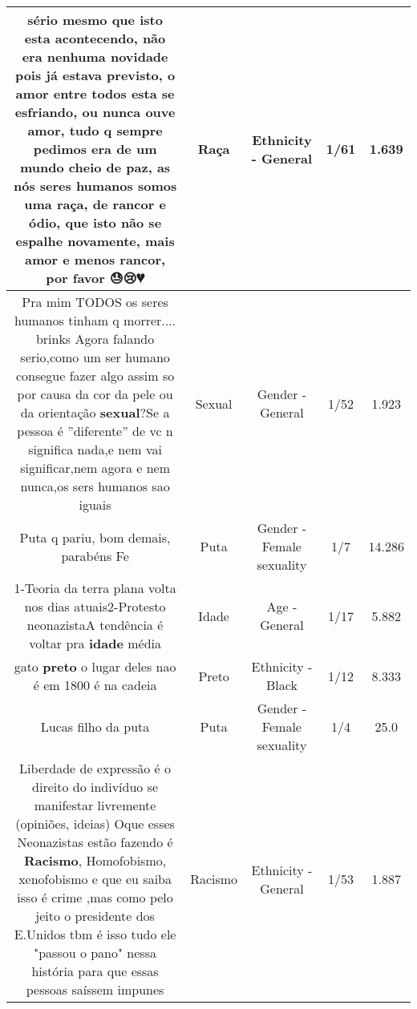 \documentclass[11pt]{article}
\newlength\mylength
\begin{document}
\begin{center}
\begin{longtable}{|C{.65\mylength}|C{.30\mylength}|C{.12\mylength}|C{.12\mylength}|C{.12\mylength}|}
  \small sério mesmo que isto esta acontecendo,  não era nenhuma novidade pois já estava previsto, o amor entre todos esta se esfriando,  ou nunca ouve amor, tudo q sempre pedimos era de um mundo cheio de paz, as nós seres humanos somos uma \textbf{raça},  de rancor e ódio,  que isto não se espalhe novamente,  mais amor e menos rancor, por favor 😓😢💔\normalsize   & Raça & Ethnicity - General & 1/61 & 1.639 \\  \hline
  \small Pra mim TODOS os seres humanos tinham q morrer.... brinks Agora falando serio,como um ser humano consegue fazer algo assim so por causa da cor da pele ou da orientação \textbf{sexual}?Se a pessoa é ''diferente'' de vc n significa nada,e nem vai significar,nem agora e  nem nunca,os sers humanos sao iguais\normalsize   & Sexual & Gender - General & 1/52 & 1.923 \\  \hline
  \small Puta q pariu, bom demais, parabéns Fe\normalsize   & Puta & Gender - Female sexuality & 1/7 & 14.286 \\  \hline
  \small 1-Teoria da terra plana volta nos dias atuais2-Protesto neonazistaA tendência é voltar pra \textbf{idade} média\normalsize   & Idade & Age - General & 1/17 & 5.882 \\  \hline
  \small gato \textbf{preto} o lugar deles nao é em 1800 é na cadeia\normalsize   & Preto & Ethnicity - Black & 1/12 & 8.333 \\  \hline
  \small Lucas filho da puta\normalsize   & Puta & Gender - Female sexuality & 1/4 & 25.0 \\  \hline
  \small Liberdade de expressão é o direito do indivíduo se manifestar livremente (opiniões, ideias) Oque esses Neonazistas estão fazendo é \textbf{Racismo}, Homofobismo,  xenofobismo e que eu saiba isso é crime ,mas como pelo jeito o presidente dos E.Unidos tbm é isso tudo ele "passou o pano" nessa história para que essas pessoas saíssem impunes\normalsize   & Racismo & Ethnicity - General & 1/53 & 1.887 \\  \hline

\end{longtable}
\end{center}
\end{document}
